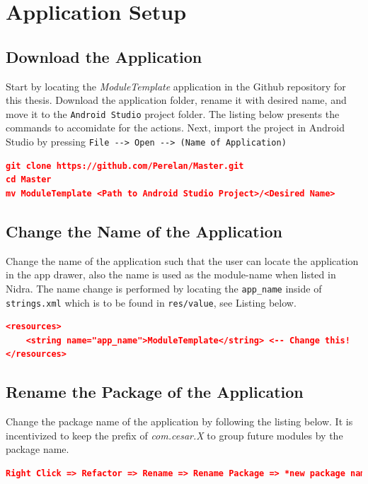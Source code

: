 \section{Application Setup}

\subsection{Download the Application}
Start by locating the \textit{ModuleTemplate} application in the Github repository for this thesis. Download the application folder, rename it with desired name, and move it to the \verb|Android Studio| project folder. The listing below presents the commands to accomidate for the actions. Next, import the project in Android Studio by pressing \verb|File --> Open --> (Name of Application)|

\begin{lstlisting}[language=json, caption={}, captionpos=b]
git clone https://github.com/Perelan/Master.git
cd Master
mv ModuleTemplate <Path to Android Studio Project>/<Desired Name>
\end{lstlisting}

\subsection{Change the Name of the Application}
Change the name of the application such that the user can locate the application in the app drawer, also the name is used as the module-name when listed in Nidra. The name change is performed by locating the \verb|app_name| inside of \verb|strings.xml| which is to be found in \verb|res/value|, see Listing below. 

\begin{lstlisting}[language=json, caption={}, captionpos=b]
<resources>
    <string name="app_name">ModuleTemplate</string> <-- Change this!
</resources>
\end{lstlisting}

\subsection{Rename the Package of the Application}
Change the package name of the application by following the listing below. It is incentivized to keep the prefix of \textit{com.cesar.X} to group future modules by the package name. 

\begin{lstlisting}[language=json, caption={}, captionpos=b]
Right Click => Refactor => Rename => Rename Package => *new package name* => Refactor
\end{lstlisting}

